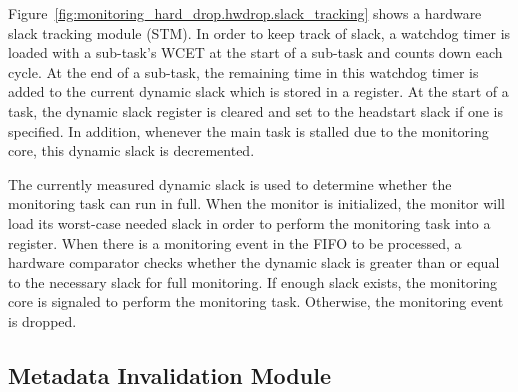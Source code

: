 Figure~\ref{fig:monitoring_hard_drop.hwdrop.slack_tracking} shows a hardware slack tracking module
(STM). In order to keep track of slack, a watchdog timer is loaded with a
sub-task's WCET at the start of a sub-task and counts down each cycle. At the
end of a sub-task, the remaining time in this watchdog timer is added to the
current dynamic slack which is stored in a register. At the start of a task,
the dynamic slack register is cleared and set to the headstart slack if one is
specified.  In addition, whenever the main task is stalled due to the
monitoring core, this dynamic slack is decremented.

The currently measured dynamic slack is used to determine whether the
monitoring task can run in full. When the monitor is initialized, the monitor
will load its worst-case needed slack in order to perform the monitoring task
into a register. When there is a monitoring event in the FIFO to be processed,
a hardware comparator checks whether the dynamic slack is greater than or equal
to the necessary slack for full monitoring. If enough slack exists, the
monitoring core is signaled to perform the monitoring task. Otherwise, the
monitoring event is dropped.

\subsection{Metadata Invalidation Module}
\label{sec:monitoring_hard_drop.hwdrop.drop}

